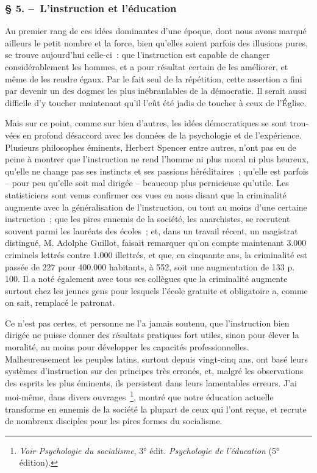 \documentclass[french,twoside]{book} %
\begin{document}
\subsubsection[{§ 5. – L’instruction et l’éducation}]{§ 5. – L’instruction et l’éducation}
\noindent Au premier rang de ces idées dominantes d’une époque, dont nous avons marqué ailleurs le petit nombre et la force, bien qu’elles soient parfois des illusions pures, se trouve aujourd’hui celle-ci : que l’instruction est capable de changer considérablement les hommes, et a pour résultat certain de les améliorer, et même de les rendre égaux. Par le fait seul de la répétition, cette assertion a fini par devenir un des dogmes les plus inébranlables de la démocratie. Il serait aussi difficile d’y toucher maintenant qu’il l’eût été jadis de toucher à ceux de l’Église.\par
Mais sur ce point, comme sur bien d’autres, les idées démocratiques se sont trou­vées en profond désaccord avec les données de la psychologie et de l’expérience. Plusieurs philosophes éminents, Herbert Spencer entre autres, n’ont pas eu de peine à montrer que l’instruction ne rend l’homme ni plus moral ni plus heureux, qu’elle ne change pas ses instincts et ses passions héréditaires ; qu’elle est parfois – pour peu qu’elle soit mal dirigée – beaucoup plus pernicieuse qu’utile. Les statisticiens sont venus confirmer ces vues en nous disant que la criminalité augmente avec la géné­ralisation de l’instruction, ou tout au moins d’une certaine instruction ; que les pires ennemis de la société, les anarchistes, se recrutent souvent parmi les lauréats des écoles ; et, dans un travail récent, un magistrat distingué, M. Adolphe Guillot, faisait remarquer qu’on compte maintenant 3.000 criminels lettrés contre 1.000 illettrés, et que, en cinquante ans, la criminalité est passée de 227 pour 400.000 habitants, à 552, soit une augmentation de 133 p. 100. Il a noté également avec tous ses collègues que la criminalité augmente surtout chez les jeunes gens pour lesquels l’école gratuite et obligatoire a, comme on sait, remplacé le patronat.\par
Ce n’est pas certes, et personne ne l’a jamais soutenu, que l’instruction bien dirigée ne puisse donner des résultats pratiques fort utiles, sinon pour élever la moralité, au moins pour développer les capacités professionnelles. Malheureusement les peuples latins, sur­tout depuis vingt-cinq ans, ont basé leurs systèmes d’instruction sur des principes très erronés, et, malgré les observations des esprits les plus éminents, ils persistent dans leurs lamentables erreurs. J’ai moi-même, dans divers ouvrages \footnote{\emph{Voir Psychologie du socialisme}, 3° édit. \emph{Psychologie de l’éducation} (5° édition).}, montré que notre éducation actuelle transforme en ennemis de la société la plupart de ceux qui l’ont reçue, et recrute de nombreux disciples pour les pires formes du socialisme.\par
\end{document}

